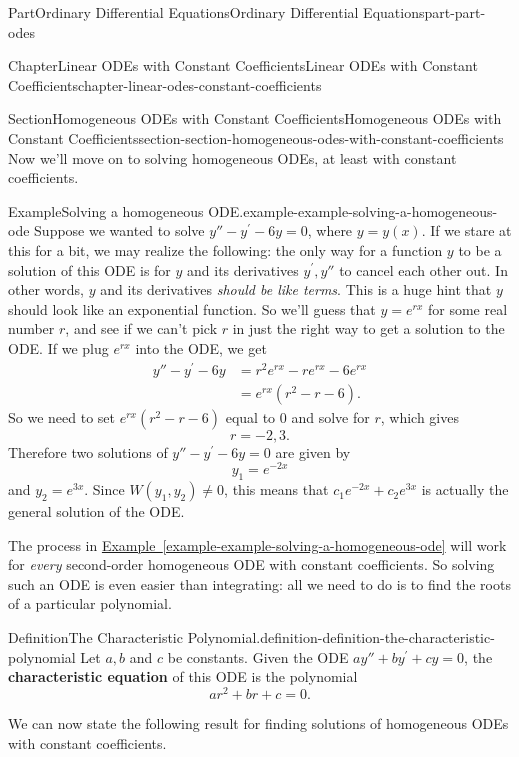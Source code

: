 \documentclass[twoside,10pt,]{book}
\newcommand{\xreffont}{\relax}
\newcommand{\terminology}[1]{\textbf{#1}}
\numberwithin{equation}{part}
\begin{document}
\begin{partptx}{Part}{Ordinary Differential Equations}{}{Ordinary Differential Equations}{}{}{part-part-odes}
\begin{chapterptx}{Chapter}{Linear ODEs with Constant Coefficients}{}{Linear ODEs with Constant Coefficients}{}{}{chapter-linear-odes-constant-coefficients}
\begin{sectionptx}{Section}{Homogeneous ODEs with Constant Coefficients}{}{Homogeneous ODEs with Constant Coefficients}{}{}{section-section-homogeneous-odes-with-constant-coefficients}
Now we'll move on to solving homogeneous ODEs, at least with constant coefficients.%
\begin{example}{Example}{Solving a homogeneous ODE.}{example-example-solving-a-homogeneous-ode}%
Suppose we wanted to solve \(y'' - y^\prime - 6y = 0\), where \(y=y(x)\). If we stare at this for a bit, we may realize the following: the only way for a function \(y\) to be a solution of this ODE is for \(y\) and its derivatives \(y^\prime,y''\) to cancel each other out. In other words, \(y\) and its derivatives \emph{should be like terms}. This is a huge hint that \(y\) should look like an exponential function. So we'll guess that \(y = e^{rx}\) for some real number \(r\), and see if we can't pick \(r\) in just the right way to get a solution to the ODE. If we plug \(e^{rx}\) into the ODE, we get%
%
\begin{align*}
y''- y^\prime - 6y & = r^{2}e^{rx} - re^{rx} - 6e^{rx} \\
& = e^{rx}(r^{2} - r - 6). 
\end{align*}
So we need to set \(e^{rx}(r^{2} - r - 6)\) equal to \(0\) and solve for \(r\), which gives%
\begin{equation*}
r = -2, 3.
\end{equation*}
Therefore two solutions of \(y'' - y^\prime - 6y = 0\) are given by%
\begin{equation*}
y_{1} = e^{-2x}
\end{equation*}
and \(y_{2} = e^{3x}\). Since \(W(y_{1},y_{2})\neq0\), this means that \(c_{1}e^{-2x} + c_{2}e^{3x}\) is actually the general solution of the ODE.%
\end{example}
The process in \hyperref[example-example-solving-a-homogeneous-ode]{Example~{\xreffont\ref{example-example-solving-a-homogeneous-ode}}} will work for \emph{every} second-order homogeneous ODE with constant coefficients. So solving such an ODE is even easier than integrating: all we need to do is to find the roots of a particular polynomial.%
\begin{definition}{Definition}{The Characteristic Polynomial.}{definition-definition-the-characteristic-polynomial}%
%
Let \(a,b\) and \(c\) be constants. Given the ODE \(ay'' + by^\prime + cy = 0\), the \terminology{characteristic equation} of this ODE is the polynomial%
\begin{equation*}
ar^{2} + br + c = 0.
\end{equation*}
%
\end{definition}
We can now state the following result for finding solutions of homogeneous ODEs with constant coefficients.%

\end{sectionptx}
\end{chapterptx}
\end{partptx}
\end{document}
